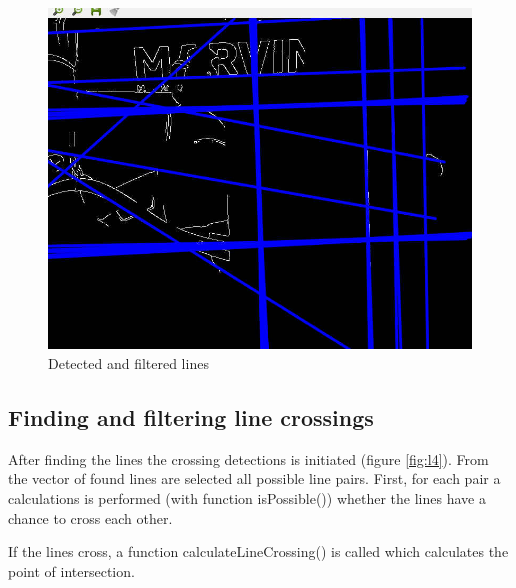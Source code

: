 \begin{figure}[ht!]
	\centering
	\includegraphics[width=\textwidth]{figures/lines3}
	\caption{Detected and filtered lines }
	\label{fig:linesHough}
\end{figure}

\subsection{Finding and filtering line crossings}
After finding the lines the crossing detections is initiated (figure \ref{fig:l4}). From the vector of found lines are selected all possible line pairs. First, for each pair a calculations is performed (with function isPossible()) whether the lines have a chance to cross each other.

If the lines cross, a function calculateLineCrossing() is called which calculates the point of intersection. 

